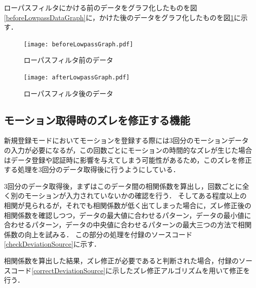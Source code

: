 \documentclass[12pt]{jreport}
\begin{document}
        ローパスフィルタにかける前のデータをグラフ化したものを図\ref{beforeLowpassDataGraph}に，かけた後のデータをグラフ化したものを図\ref{afterLowpassDataGraph}に示す．

        \begin{figure}[!bhtp]
            \begin{minipage}{0.5\hsize}
                \begin{center}
                    \texttt{[image: beforeLowpassGraph.pdf]}
                \end{center}
                \caption{ローパスフィルタ前のデータ}
                \label{beforeLowpassDataGraph}
            \end{minipage}
            \begin{minipage}{0.5\hsize}
                \begin{center}
                    \texttt{[image: afterLowpassGraph.pdf]}
                \end{center}
                \caption{ローパスフィルタ後のデータ}
                \label{afterLowpassDataGraph}
            \end{minipage}
        \end{figure}

        \subsection{モーション取得時のズレを修正する機能}
        新規登録モードにおいてモーションを登録する際には3回分のモーションデータの入力が必要になるが，この回数ごとにモーションの時間的なズレが生じた場合はデータ登録や認証時に影響を与えてしまう可能性があるため，このズレを修正する処理を3回分のデータ取得後に行うようにしている．

        3回分のデータ取得後，まずはこのデータ間の相関係数を算出し，回数ごとに全く別のモーションが入力されていないかの確認を行う．
        そしてある程度以上の相関が見られるが，それでも相関係数が低く出てしまった場合に，ズレ修正後の相関係数を確認しつつ，データの最大値に合わせるパターン，データの最小値に合わせるパターン，データの中央値に合わせるパターンの最大三つの方法で相関係数の向上を試みる．
        この部分の処理を付録のソースコード\ref{checkDeviationSource}に示す．

        相関係数を算出した結果，ズレ修正が必要であると判断された場合，付録のソースコード\ref{correctDeviationSource}に示したズレ修正アルゴリズムを用いて修正を行う．
\end{document}

